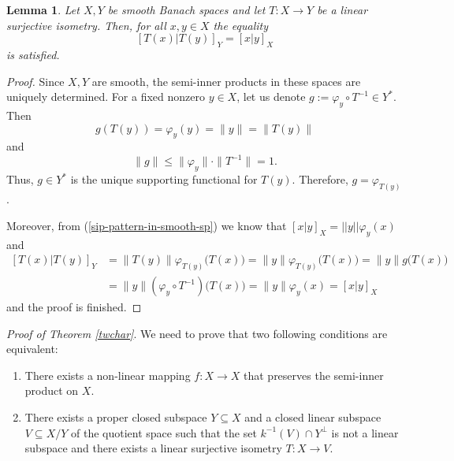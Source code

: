 \documentclass[12pt, reqno]{amsart}
\newtheorem{lemma}[theorem]{Lemma}
\theoremstyle{definition}
\theoremstyle{remark}
\numberwithin{equation}{section}
\newcommand{\sip}[2]{\left[#1|#2\right]}
\begin{document}
\begin{lemma}\label{lem-isom-t-pres-sip-x}
Let $X, Y$ be smooth Banach spaces and let $T\colon X \to Y$ be a linear surjective isometry. Then, for all $x, y \in X$ the equality
$$\sip{T(x)}{T(y)}_{Y}= \sip{x}{y}_X$$
is satisfied.
\end{lemma}
\begin{proof}
Since $X, Y$ are smooth, the semi-inner products in these spaces are uniquely determined. For a fixed nonzero $y \in X$, let us denote $g:= \varphi_y \circ T^{-1} \in Y^*$. Then
$$g(T(y)) = \varphi_y(y)=\|y\|=\|T(y)\|$$
and
$$\|g\| \leq \|\varphi_y\| \cdot \|T^{-1}\| = 1.$$
Thus, $g\in Y^*$ is the unique supporting functional for $T(y)$. Therefore, $g=\varphi_{T(y)}$.

Moreover, from (\ref{sip-pattern-in-smooth-sp}) we know that $\sip{x}{y}_X = ||y|| \varphi_y(x)$ and
\begin{align*}
\sip{T(x)}{T(y)}_Y &=\|T(y)\| \varphi_{T(y)}\big(T(x)\big) =\|y\| \varphi_{T(y)}\big(T(x)\big)=\|y\| g\big(T(x)\big)\\
&=\|y\| (\varphi_y \circ T^{-1})\big(T(x)\big)=\|y\|\varphi_y(x)=\sip{x}{y}_X
\end{align*}
and the proof is finished.
\end{proof}

\emph{Proof of Theorem \ref{twchar}}. We need to prove that two following conditions are equivalent:
\begin{enumerate}
\item There exists a non-linear mapping $f:X \to X$ that preserves the semi-inner product on $X$.
\item There exists a proper closed subspace $Y \subseteq X$ and a closed linear subspace $V \subseteq X/Y$ of the quotient space such that the set $k^{-1}(V) \cap Y^{\bot}$ is not a linear subspace and there exists a linear surjective isometry $T:X \to V$.
\end{enumerate}
\end{document}
